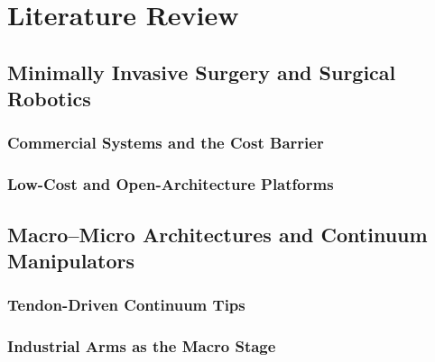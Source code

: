 \chapter{Literature Review}
\label{ch:literature}

\section{Minimally Invasive Surgery and Surgical Robotics}
\label{sec:lit-mis}

\subsection{Commercial Systems and the Cost Barrier}
\label{sec:lit-commercial}

\subsection{Low-Cost and Open-Architecture Platforms}
\label{sec:lit-open}

\section{Macro--Micro Architectures and Continuum Manipulators}
\label{sec:lit-macro-micro}

\subsection{Tendon-Driven Continuum Tips}
\label{sec:lit-continuum}

\subsection{Industrial Arms as the Macro Stage}
\label{sec:lit-industrial-macro}

